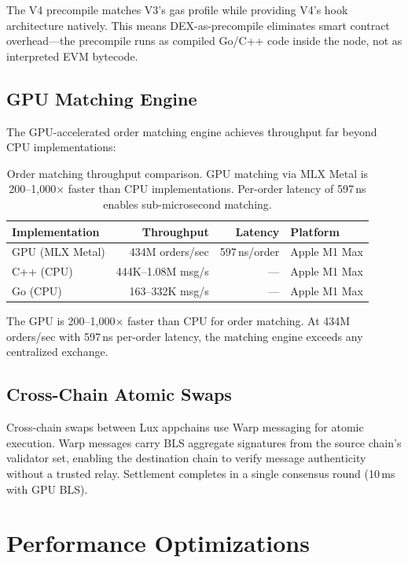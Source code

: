\documentclass[11pt,letterpaper]{article}
\begin{document}
The V4 precompile matches V3's gas profile while providing V4's hook architecture
natively. This means DEX-as-precompile eliminates smart contract overhead---the
precompile runs as compiled Go/C++ code inside the node, not as interpreted EVM
bytecode.

\subsection{GPU Matching Engine}

The GPU-accelerated order matching engine achieves throughput far beyond CPU
implementations:

\begin{table}[h]
\centering
\begin{tabular}{lrrl}
\toprule
\textbf{Implementation} & \textbf{Throughput} & \textbf{Latency} & \textbf{Platform} \\
\midrule
GPU (MLX Metal)   & 434M orders/sec   & 597\,ns/order  & Apple M1 Max \\
C++ (CPU)         & 444K--1.08M msg/s & ---            & Apple M1 Max \\
Go (CPU)          & 163--332K msg/s   & ---            & Apple M1 Max \\
\bottomrule
\end{tabular}
\caption{Order matching throughput comparison. GPU matching via MLX Metal is
200--1{,}000$\times$ faster than CPU implementations. Per-order latency of 597\,ns
enables sub-microsecond matching.}
\end{table}

The GPU is 200--1{,}000$\times$ faster than CPU for order matching. At 434M orders/sec
with 597\,ns per-order latency, the matching engine exceeds any centralized exchange.

\subsection{Cross-Chain Atomic Swaps}

Cross-chain swaps between Lux appchains use Warp messaging for atomic execution.
Warp messages carry BLS aggregate signatures from the source chain's validator set,
enabling the destination chain to verify message authenticity without a trusted relay.
Settlement completes in a single consensus round (10\,ms with GPU BLS).

\section{Performance Optimizations}
\end{document}
